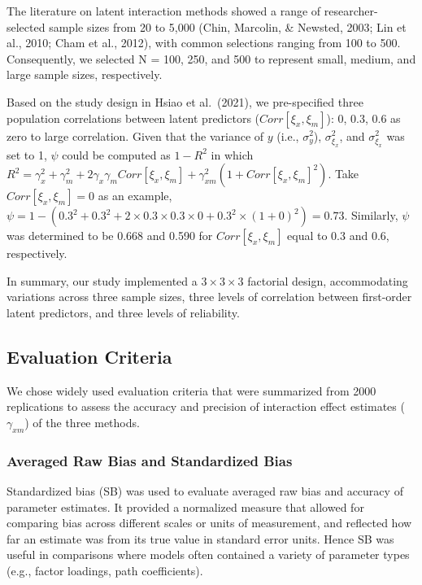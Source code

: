 \documentclass[
  man]{apa6}
\begin{document}
The literature on latent interaction methods showed a range of researcher-selected sample sizes from 20 to 5,000 (Chin, Marcolin, \& Newsted, 2003; Lin et al., 2010; Cham et al., 2012), with common selections ranging from 100 to 500. Consequently, we selected N = 100, 250, and 500 to represent small, medium, and large sample sizes, respectively.

Based on the study design in Hsiao et al.~(2021), we pre-specified three population correlations between latent predictors (\(Corr[{\xi_{x},\xi_{m}}]\)): 0, 0.3, 0.6 as zero to large correlation. Given that the variance of \(y\) (i.e., \(\sigma_{y}^2\)), \(\sigma_{\xi_{x}}^2\), and \(\sigma_{\xi_{x}}^2\) was set to 1, \(\psi\) could be computed as \(1 - R^2\) in which \(R^2 = \gamma_{x}^2 + \gamma_{m}^2 + 2\gamma_{x}\gamma_{m}Corr[{\xi_{x},\xi_{m}}] + \gamma_{xm}^2(1 + Corr[{\xi_{x},\xi_{m}}]^2)\). Take \(Corr[{\xi_{x},\xi_{m}}] = 0\) as an example, \(\psi = 1 - (0.3^2 + 0.3^2 + 2\times0.3\times0.3\times0 + 0.3^2\times(1 + 0)^2) = 0.73\). Similarly, \(\psi\) was determined to be 0.668 and 0.590 for \(Corr[{\xi_{x},\xi_{m}}]\) equal to 0.3 and 0.6, respectively.

In summary, our study implemented a \(3 \times 3 \times 3\) factorial design, accommodating variations across three sample sizes, three levels of correlation between first-order latent predictors, and three levels of reliability.

\hypertarget{evaluation-criteria}{%
\subsection{Evaluation Criteria}\label{evaluation-criteria}}

We chose widely used evaluation criteria that were summarized from 2000 replications to assess the accuracy and precision of interaction effect estimates (\(\gamma_{xm}\)) of the three methods.

\hypertarget{averaged-raw-bias-and-standardized-bias}{%
\subsubsection{Averaged Raw Bias and Standardized Bias}\label{averaged-raw-bias-and-standardized-bias}}

Standardized bias (SB) was used to evaluate averaged raw bias and accuracy of parameter estimates. It provided a normalized measure that allowed for comparing bias across different scales or units of measurement, and reflected how far an estimate was from its true value in standard error units. Hence SB was useful in comparisons where models often contained a variety of parameter types (e.g., factor loadings, path coefficients).
\end{document}
